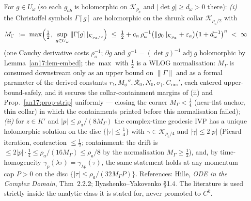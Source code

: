 \begin{remark}\label{an17:rem-CK}
For $g\in U_\omega$ (so each $g_{ab}$ is holomorphic on $\mathcal K_{\rho_a}$ and
$|\det g|\ge d_\omega>0$ there): \emph{(i)} the Christoffel symbols $\Gamma[g]$
are holomorphic on the shrunk collar $\mathcal K_{\rho_a/2}$ with
\begin{equation}\label{an17:eq-MGamma}
 M_\Gamma\;:=\;\max\Bigl(\tfrac12,\ \sup_{g\in U_\omega}\|\Gamma[g]\|_{\mathcal K_{\rho_a/2}}\Bigr)\;\le\;
 \tfrac12+c_n\,\rho_a^{-1}\bigl(\|g_0\|_{\mathcal K_{\rho_a}}+\varepsilon_a\bigr)
 \bigl(1+d_\omega^{-1}\bigr)^{n}\;<\;\infty
\end{equation}
(one Cauchy derivative costs $\rho_a^{-1}$; $\partial g$ and $g^{-1}=(\det g)^{-1}
\operatorname{adj}g$ holomorphic by Lemma~\ref{an17:lem-embed}; the $\max$ with
$\tfrac12$ is a WLOG normalisation: $M_\Gamma$ is consumed downstream only as an
upper bound on $\|\Gamma\|$ and as a formal parameter of the derived constants
$r_t,M_\phi'',\mathcal R_0,N_0,\sigma_\dagger,C_{\mathrm{rim}}'$, each entered
upper-bound-safely, and it secures the collar-containment margins of (ii) and
Prop.~\ref{an17:prop-strip} uniformly --- closing the corner $M_\Gamma<\tfrac14$
(near-flat anchor, thin collar) in which the containments printed before this
normalisation failed); \emph{(ii)} for
$z\in K'$ and $|p|\le\rho_a/(8M_\Gamma)$ the complex-time geodesic IVP has a
unique holomorphic solution on the disc $\{|\tau|\le\tfrac14\}$ with $\gamma\in
\mathcal K_{\rho_a/4}$ and $|\dot\gamma|\le2|p|$ (Picard iteration, contraction
$\le\tfrac12$; containment: the drift is $\le2|p|\cdot\tfrac14\le
\rho_a/(16M_\Gamma)\le\rho_a/8$ by the normalisation $M_\Gamma\ge\tfrac12$), and,
by time-homogeneity $\gamma_p(\lambda\tau)=\gamma_{\lambda p}(\tau)$, the same
statement holds at any momentum cap $P>0$ on the disc
$\{|\tau|\le\rho_a/(32M_\Gamma P)\}$. References: Hille, \emph{ODE in the Complex Domain}, Thm~2.2.2;
Ilyashenko--Yakovenko \S1.4. The literature is used strictly inside the analytic
class it is stated for, never promoted to $C^k$.
\end{remark}

